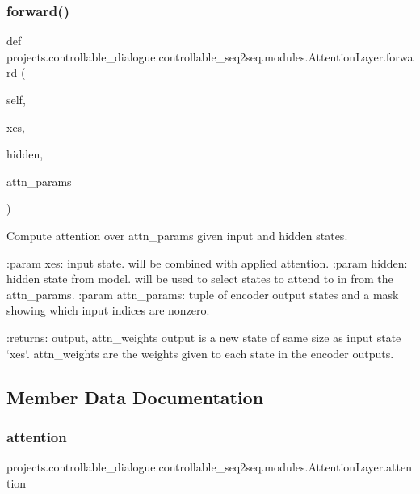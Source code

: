 \subsubsection{\texorpdfstring{forward()}{forward()}}
{\footnotesize\ttfamily def projects.\+controllable\+\_\+dialogue.\+controllable\+\_\+seq2seq.\+modules.\+Attention\+Layer.\+forward (\begin{DoxyParamCaption}\item[{}]{self,  }\item[{}]{xes,  }\item[{}]{hidden,  }\item[{}]{attn\+\_\+params }\end{DoxyParamCaption})}

\begin{DoxyVerb}Compute attention over attn_params given input and hidden states.

:param xes:         input state. will be combined with applied
            attention.
:param hidden:      hidden state from model. will be used to select
            states to attend to in from the attn_params.
:param attn_params: tuple of encoder output states and a mask showing
            which input indices are nonzero.

:returns: output, attn_weights
  output is a new state of same size as input state `xes`.
  attn_weights are the weights given to each state in the
  encoder outputs.
\end{DoxyVerb}
 

\subsection{Member Data Documentation}
\mbox{\label{classprojects_1_1controllable__dialogue_1_1controllable__seq2seq_1_1modules_1_1AttentionLayer_afe3902f442288aaef94b75b15b6547b7}} 
\subsubsection{\texorpdfstring{attention}{attention}}
{\footnotesize\ttfamily projects.\+controllable\+\_\+dialogue.\+controllable\+\_\+seq2seq.\+modules.\+Attention\+Layer.\+attention}

